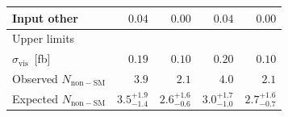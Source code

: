 \begin{table}
\begin{center}
\begin{tabular}{lrrrr}
      Input other                     & $0.04$                & $0.00$                & $0.04$                & $0.00$           \\
      \midrule
      Upper limits \\
      \midrule
      $\sigma_\mathrm{vis}$~[fb]      & $0.19$                & $0.10$                & $0.20$                & $0.10$                \\[1ex]
      Observed $N_\mathrm{non-SM}$    & $3.9$                 & $2.1$                 & $4.0$                 & $2.1$                 \\[1ex]
      Expected $N_\mathrm{non-SM}$    & ${3.5}^{+1.9}_{-1.4}$ & ${2.6}^{+1.6}_{-0.6}$ & ${3.0}^{+1.7}_{-1.0}$ & ${2.7}^{+1.6}_{-0.7}$ \\
      \bottomrule
    \end{tabular}
  \end{center}
\end{table}

